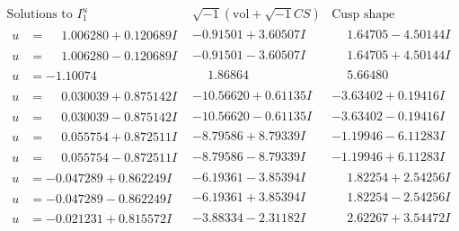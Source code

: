 \documentclass[1p]{elsarticle_modified}
\theoremstyle{definition}
\newcommand{\I}{\sqrt{-1}}
\begin{document}
$$\begin{array}{c|c|c}  
\text{Solutions to }I^u_{1}& \I (\text{vol} + \sqrt{-1}CS) & \text{Cusp shape}\\
 \hline 
\begin{aligned}
u &= \phantom{-}1.006280 + 0.120689 I\end{aligned}
 & -0.91501 + 3.60507 I & \phantom{-}1.64705 - 4.50144 I \\ \hline\begin{aligned}
u &= \phantom{-}1.006280 - 0.120689 I\end{aligned}
 & -0.91501 - 3.60507 I & \phantom{-}1.64705 + 4.50144 I \\ \hline\begin{aligned}
u &= -1.10074\phantom{ +0.000000I}\end{aligned}
 & \phantom{-}1.86864\phantom{ +0.000000I} & \phantom{-}5.66480\phantom{ +0.000000I} \\ \hline\begin{aligned}
u &= \phantom{-}0.030039 + 0.875142 I\end{aligned}
 & -10.56620 + 0.61135 I & -3.63402 + 0.19416 I \\ \hline\begin{aligned}
u &= \phantom{-}0.030039 - 0.875142 I\end{aligned}
 & -10.56620 - 0.61135 I & -3.63402 - 0.19416 I \\ \hline\begin{aligned}
u &= \phantom{-}0.055754 + 0.872511 I\end{aligned}
 & -8.79586 + 8.79339 I & -1.19946 - 6.11283 I \\ \hline\begin{aligned}
u &= \phantom{-}0.055754 - 0.872511 I\end{aligned}
 & -8.79586 - 8.79339 I & -1.19946 + 6.11283 I \\ \hline\begin{aligned}
u &= -0.047289 + 0.862249 I\end{aligned}
 & -6.19361 - 3.85394 I & \phantom{-}1.82254 + 2.54256 I \\ \hline\begin{aligned}
u &= -0.047289 - 0.862249 I\end{aligned}
 & -6.19361 + 3.85394 I & \phantom{-}1.82254 - 2.54256 I \\ \hline\begin{aligned}
u &= -0.021231 + 0.815572 I\end{aligned}
 & -3.88334 - 2.31182 I & \phantom{-}2.62267 + 3.54472 I \\ \hline\begin{aligned}

\end{aligned}
\end{array}$$
\end{document}
